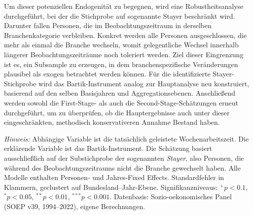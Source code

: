 \documentclass[12pt,a4paper]{article}
\begin{document}
Um dieser potenziellen Endogenität zu begegnen, wird eine Robustheitsanalyse durchgeführt, bei der die Stichprobe auf sogenannte Stayer beschränkt wird. Darunter fallen Personen, die im Beobachtungszeitraum in derselben Branchenkategorie verbleiben. Konkret werden alle Personen ausgeschlossen, die mehr als einmal die Branche wechseln, womit gelegentliche Wechsel innerhalb längerer Beobachtungszeiträume noch toleriert werden. Ziel dieser Eingrenzung ist es, ein Subsample zu erzeugen, in dem branchenspezifische Veränderungen plausibel als exogen betrachtet werden können. Für die identifizierte Stayer-Stichprobe wird das Bartik-Instrument analog zur Hauptanalyse neu konstruiert, basierend auf den selben Basisjahren und Aggregationsebenen. Anschließend werden sowohl die First-Stage- als auch die Second-Stage-Schätzungen erneut durchgeführt, um zu überprüfen, ob die Hauptergebnisse auch unter dieser eingeschränkten, methodisch konservativeren Annahme Bestand haben.

\begin{table}[H]
\centering
\caption{First-Stage-Ergebnisse im Vergleich: Gesamtstichprobe und Stayer}
\label{tab:firststage_comparison}
\begin{tablenotes}
\footnotesize
\item \textit{Hinweis:} Abhängige Variable ist die tatsächlich geleistete Wochenarbeitszeit. Die erklärende Variable ist das Bartik-Instrument. Die Schätzung basiert ausschließlich auf der Substichprobe der sogenannten \textit{Stayer}, also Personen, die während des Beobachtungszeitraums nicht die Branche gewechselt haben. Alle Modelle enthalten Personen- und Jahres-Fixed Effects. Standardfehler in Klammern, geclustert auf Bundesland–Jahr-Ebene. Signifikanzniveaus: $^{+}p<0.1$, $^{*}p<0.05$, $^{**}p<0.01$, $^{***}p<0.001$. Datenbasis: Sozio-oekonomisches Panel (SOEP v39, 1994--2022), eigene Berechnungen.
\end{tablenotes}
\end{table}
\end{document}
